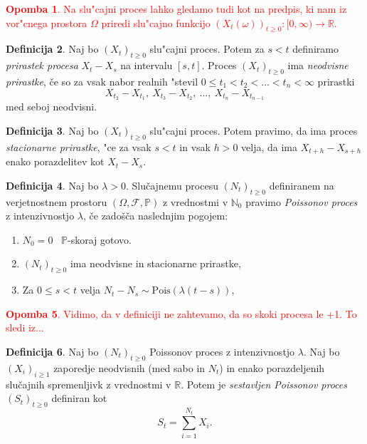 \documentclass[12pt,a4paper]{amsart}
\theoremstyle{definition} %
\newtheorem{definicija}{Definicija}[section]
\newtheorem{opomba}[definicija]{Opomba}
\theoremstyle{plain} %
\newcommand{\N}{\mathbb{N}}
\newcommand{\Prob}{\mathbb{P}}
\newcommand{\1}{\mathds{1}}
\newcommand{\Pois}[1]{\text{Pois}(#1)}
\begin{document}
\textcolor{red}{
    \begin{opomba}
        Na slu"cajni proces lahko gledamo tudi kot na predpis, ki nam iz vor"cnega prostora 
        $\Omega$ priredi slu"cajno funkcijo
        $(X_t(\omega))_{t\geq0}: [0, \infty) \rightarrow \mathbb{R}$.
        \label{op:slucFunkc}
    \end{opomba}
}
    \begin{definicija}
        Naj bo $(X_t)_{t\geq0}$ slu"cajni proces. Potem za $s < t$ definiramo
        \textit{prirastek procesa} $X_t - X_s$ na intervalu $[s, t]$. Proces $(X_t)_{t\geq0}$ ima 
        \textit{neodvisne prirastke}, če so za vsak nabor realnih "stevil
        $0 \leq t_1 < t_2 < \ldots < t_n < \infty$ prirastki
        $$
            X_{t_2} - X_{t_1}, \ X_{t_3} - X_{t_2}, \ \ldots, \ X_{t_n} - X_{t_{n-1}}
        $$
        med seboj neodvisni.
        \label{def:prirastek}
    \end{definicija}

    \begin{definicija}
        Naj bo $(X_t)_{t\geq0}$ slu"cajni proces. Potem pravimo, da ima proces
        \textit{stacionarne prirastke}, "ce za vsak $s < t$ in vsak $h > 0$ velja, 
        da ima $X_{t+h} - X_{s+h}$ enako porazdelitev kot $X_t - X_s$.
        \label{def:stacPrir}
    \end{definicija}

    \begin{definicija}
        Naj bo $\lambda > 0$. Slučajnemu procesu $(N_t)_{t\geq 0}$ definiranem na verjetnostnem 
        prostoru $(\Omega, \mathcal{F}, \mathbb{P})$ z vrednostmi v $\N_0$ pravimo 
        \textit{Poissonov proces} z intenzivnostjo $\lambda$, če zadošča naslednjim pogojem:
        \begin{enumerate}
            \item $N_0 = 0$ \ $\Prob$-skoraj gotovo.
            \item $(N_t)_{t\geq 0}$ ima neodvisne in stacionarne prirastke,
            \item Za $0 \leq s < t$ velja $ N_t - N_s \sim\Pois{\lambda(t - s)}$,
        \end{enumerate}
        \label{def:HPP}
    \end{definicija}
\textcolor{red}{
    \begin{opomba}
        Vidimo, da v definiciji ne zahtevamo, da so skoki procesa le +1. To sledi iz...
        \label{op:skoki}
    \end{opomba}
}
    \begin{definicija}
        Naj bo $(N_t)_{t\geq0}$ Poissonov proces z intenzivnostjo $\lambda$. 
        Naj bo $(X_i)_{i\geq1}$ zaporedje neodvisnih (med sabo in $N_t$) in enako 
        porazdeljenih slučajnih spremenljivk z vrednostmi v $\mathbb{R}$. Potem je 
        \textit{sestavljen Poissonov proces} $(S_t)_{t\geq0}$ definiran kot
        $$
            S_t = \sum_{i=1}^{N_t} X_i.
        $$
        \label{def:CPP}
    \end{definicija}
\end{document}
